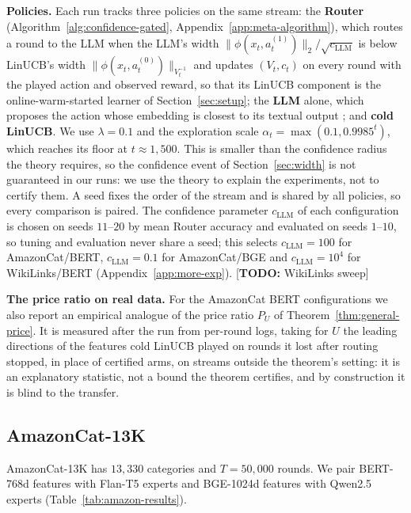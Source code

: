 \documentclass{article}
\theoremstyle{definition}
\theoremstyle{remark}
\theoremstyle{remark}
\newcommand{\todo}[1]{\textcolor{red!70!black}{[\textbf{TODO:} #1]}}
\begin{document}
\textbf{Policies.} Each run tracks three policies on the same stream: the
\textbf{Router} (Algorithm~\ref{alg:confidence-gated},
Appendix~\ref{app:meta-algorithm}), which routes a round to the LLM when the
LLM's width $\|\phi(x_t,a_t^{(1)})\|_2/\sqrt{c_{\mathrm{LLM}}}$ is below LinUCB's width
$\|\phi(x_t,a_t^{(0)})\|_{V_t^{-1}}$ and updates $(V_t,c_t)$ on every round
with the played action and observed reward, so that its LinUCB component is
the online-warm-started learner of Section~\ref{sec:setup}; the \textbf{LLM}
alone, which proposes the action whose embedding is closest to its textual
output \cite{chen2024llmdecision}; and \textbf{cold LinUCB}. We use
$\lambda=0.1$ and the exploration scale $\alpha_t=\max(0.1,0.9985^t)$, which
reaches its floor at $t\approx1{,}500$. This is smaller than the confidence
radius the theory requires, so the confidence event of
Section~\ref{sec:width} is not guaranteed in our runs: we use the theory to
explain the experiments, not to certify them. A seed fixes the order of the
stream and is shared by all policies, so every comparison is paired. The
confidence parameter $c_{\mathrm{LLM}}$ of each configuration is chosen on seeds $11$--$20$
by mean Router accuracy and evaluated on seeds $1$--$10$, so tuning and
evaluation never share a seed; this selects $c_{\mathrm{LLM}}=100$ for AmazonCat/BERT,
$c_{\mathrm{LLM}}=0.1$ for AmazonCat/BGE and $c_{\mathrm{LLM}}=10^4$ for WikiLinks/BERT
(Appendix~\ref{app:more-exp}).
\todo{WikiLinks sweep}

\textbf{The price ratio on real data.} For the AmazonCat BERT configurations
we also report an empirical analogue of the price ratio $P_U$ of
Theorem~\ref{thm:general-price}. It is measured after the run from per-round
logs, taking for $U$ the leading directions of the features cold LinUCB
played on rounds it lost after routing stopped, in place of certified arms,
on streams outside the theorem's setting: it is an explanatory statistic, not
a bound the theorem certifies, and by construction it is blind to the
transfer.

\subsection{AmazonCat-13K}
\label{sec:amazon}

AmazonCat-13K has $13{,}330$ categories and $T=50{,}000$ rounds. We pair
BERT-768d features with Flan-T5 experts and BGE-1024d features with Qwen2.5
experts (Table~\ref{tab:amazon-results}).
\end{document}
